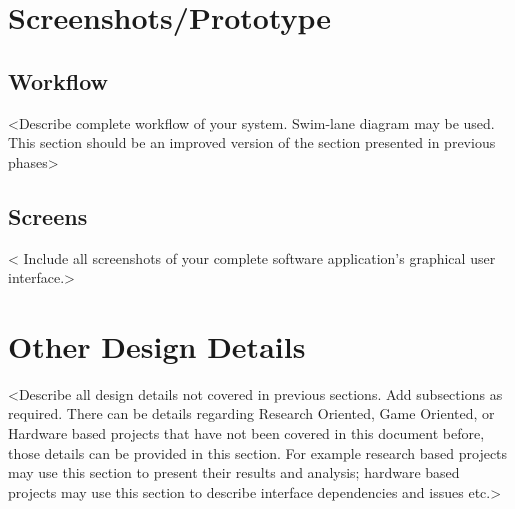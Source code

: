\section{Screenshots/Prototype}
\subsection{Workflow}
<Describe complete workflow of your system. Swim-lane diagram may be used. This section should be an improved version of the section presented in previous phases>

\subsection{Screens}
< Include all screenshots of your complete software application’s graphical user interface.>

\section{Other Design Details}
<Describe all design details not covered in previous sections. Add subsections as required. There can be details regarding Research Oriented, Game Oriented, or Hardware based projects that have not been covered in this document before, those details can be provided in this section. For example research based projects may use this section to present their results and analysis; hardware based projects may use this section to describe interface dependencies and issues etc.>